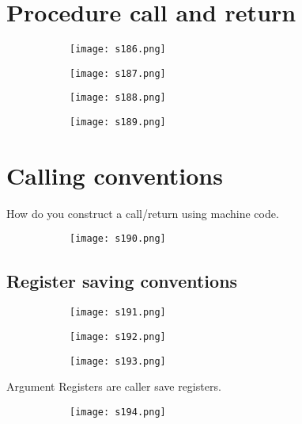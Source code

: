 \documentclass[8pt]{extreport}
\begin{document}
\section{Procedure call and return}
\begin{figure}[H]
\centering
\begin{subfigure}[b]{0.4\linewidth}
\texttt{[image: s186.png]}
\end{subfigure}
\begin{subfigure}[b]{0.4\linewidth}
\texttt{[image: s187.png]}
\end{subfigure}
\begin{subfigure}[b]{0.4\linewidth}
\texttt{[image: s188.png]}
\end{subfigure}
\begin{subfigure}[b]{0.4\linewidth}
\texttt{[image: s189.png]}
\end{subfigure}
\end{figure}

\section{Calling conventions}

How do you construct a call/return using machine code.
\begin{figure}[H]
\centering
\begin{subfigure}[b]{0.4\linewidth}
\texttt{[image: s190.png]}
\end{subfigure}
\end{figure}

\subsection{Register saving conventions}
\begin{figure}[H]
\centering
\begin{subfigure}[b]{0.4\linewidth}
\texttt{[image: s191.png]}
\end{subfigure}
\begin{subfigure}[b]{0.4\linewidth}
\texttt{[image: s192.png]}
\end{subfigure}
\begin{subfigure}[b]{0.4\linewidth}
\texttt{[image: s193.png]}
\end{subfigure}
\end{figure}
Argument Registers are caller save registers.
\begin{figure}[H]
\centering
\begin{subfigure}[b]{0.4\linewidth}
\texttt{[image: s194.png]}
\end{subfigure}
\end{figure}
\end{document}
